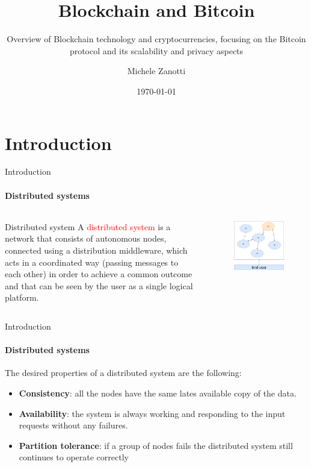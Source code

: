 \documentclass{beamer}
\title{Blockchain and Bitcoin}
\subtitle[]{Overview of Blockchain technology and cryptocurrencies, focusing on
the Bitcoin protocol and its scalability and privacy aspects}
\institute[]{Università degli studi di Brescia}
\author{Michele Zanotti}
\date{\today}
\begin{document}
  \begin{frame}
    \titlepage
  \end{frame}

  \section{Introduction}
  \begin{frame}{Introduction}
    \framesubtitle{Distributed systems}
    \begin{columns}[onlytextwidth]
       \begin{block}{Distributed system}
        A \textcolor{red}{distributed system} is a network that consists of autonomous nodes,
        connected using a distribution middleware, which acts in a coordinated way
        (passing messages to each other) in order to achieve a common outcome and
        that can be seen by the user as a single logical platform.
      \end{block}

      \begin{figure}[!htb]
        \centering
        \includegraphics[width=0.7\linewidth]{../img/distributed-system.png}
      \end{figure}
    \end{columns}
  \end{frame}




  \begin{frame}{Introduction}
    \framesubtitle{Distributed systems}
      The desired properties of a distributed system are the following:\vspace{10pt}
      \begin{itemize}
        \item \textbf{Consistency}: all the nodes have the same lates available copy of the data.
        \item \textbf{Availability}: the system is always working and responding to the
        input requests without any failures.
        \item \textbf{Partition tolerance}: if a group of nodes fails the distributed system
        still continues to operate correctly
      \end{itemize}
  \end{frame}
\end{document}
